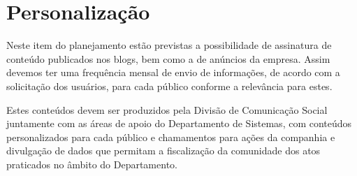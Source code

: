 \chapter{Personalização}

Neste item do planejamento estão previstas a possibilidade de assinatura de conteúdo publicados nos blogs, bem como a de anúncios da empresa. Assim devemos ter uma frequência mensal de envio de informações, de acordo com a solicitação dos usuários, para cada público conforme a relevância para estes.

Estes conteúdos devem ser produzidos pela Divisão de Comunicação Social juntamente com as áreas de apoio do Departamento de Sistemas, com conteúdos personalizados para cada público e chamamentos para ações da companhia e divulgação de dados que permitam a fiscalização da comunidade dos atos praticados no âmbito do Departamento.
